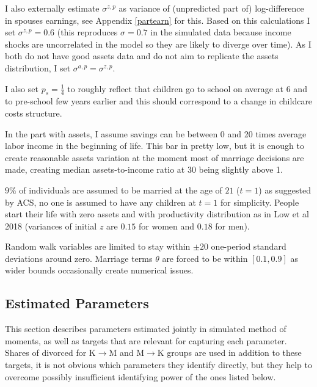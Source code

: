 \documentclass[12pt,letter]{article}
\begin{document}
I also externally estimate $\sigma^{z,p}$ as variance of (unpredicted part of) log-difference in spouses earnings, see Appendix \ref{partearn} for this. Based on this calculations I set $\sigma^{z,p} = 0.6$ (this reproduces $\sigma = 0.7$ in the simulated data because income shocks are uncorrelated in the model so they are likely to diverge over time). As I both do not have good assets data and do not aim to replicate the assets distribution, I set $\sigma^{a,p} = \sigma^{z,p}$.

I also set $p_s = \frac14$ to roughly reflect that children go to school on average at 6 and to pre-school few years earlier and this should correspond to a change in childcare costs structure.

In the part with assets, I assume savings can be between 0 and 20 times average labor income in the beginning of life. This bar in pretty low, but it is enough to create reasonable assets variation at the moment most of marriage decisions are made, creating median assets-to-income ratio at 30 being slightly above 1.

$9\%$ of individuals are assumed to be married at the age of $21$ ($t = 1$) as suggested by ACS, no one is assumed to have any children at $t = 1$ for simplicity. People start their life with zero assets and with productivity distribution as in Low et al 2018 (variances of initial $z$ are $0.15$ for women and $0.18$ for men). 

Random walk variables are limited to stay within $\pm 20$ one-period standard deviations around zero. Marriage terms $\theta$ are forced to be within $[0.1,0.9]$ as wider bounds occasionally create numerical issues. 

\subsection{Estimated Parameters}
This section describes parameters estimated jointly in simulated method of moments, as well as targets that are relevant for capturing each parameter. Shares of divorced for K$\to$M and M$\to$K groups are used in addition to these targets, it is not obvious which parameters they identify directly, but they help to overcome possibly insufficient identifying power of the ones listed below. 
\end{document}
